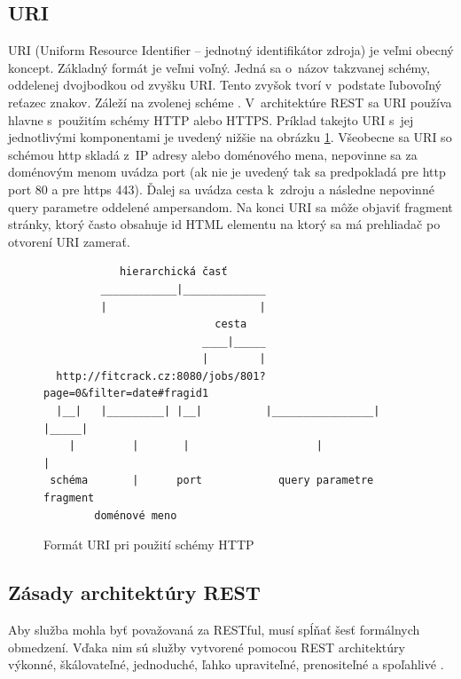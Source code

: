 \documentclass[zadani,slovak]{fitthesis}
\begin{document}
\subsection{URI} \label{URI}
URI (Uniform Resource Identifier – jednotný identifikátor zdroja) je veľmi obecný koncept. Základný formát je veľmi voľný. Jedná sa o~názov takzvanej schémy, oddelenej dvojbodkou od zvyšku URI. Tento zvyšok tvorí v~podstate ľubovoľný reťazec znakov. Záleží na zvolenej schéme \cite{URIRFC}. V~architektúre REST sa URI používa hlavne s~použitím schémy HTTP alebo HTTPS. Príklad takejto URI s~jej jednotlivými komponentami je uvedený nižšie na obrázku \ref{fig:formatURI}. Všeobecne sa URI so schémou http skladá z~IP adresy alebo doménového mena, nepovinne sa za doménovým menom uvádza port (ak nie je uvedený tak sa predpokladá pre http port 80 a pre https 443). Ďalej sa uvádza cesta k~zdroju a následne nepovinné query parametre oddelené ampersandom. Na konci URI sa môže objaviť fragment stránky, ktorý často obsahuje id HTML elementu na ktorý sa má prehliadač po otvorení URI zamerať.



\begin{figure}[H]
\begin{center}
\begin{varwidth}{\linewidth}
\begin{verbatim}
            hierarchická časť
         ____________|_____________                  
         |                        |
                           cesta
                         ____|_____
                         |        |
  http://fitcrack.cz:8080/jobs/801?page=0&filter=date#fragid1
  |__|   |_________| |__|          |________________| |_____|
    |         |       |                    |               |
 schéma       |      port            query parametre    fragment
        doménové meno

\end{verbatim}
\end{varwidth}
\end{center}
\caption{Formát URI pri použití schémy HTTP}
\label{fig:formatURI}
\end{figure}



\subsection{Zásady architektúry REST} \label{zasadyREST}
Aby služba mohla byť považovaná za RESTful, musí spĺňať šesť formálnych obmedzení. Vďaka nim sú služby vytvorené pomocou REST architektúry výkonné, škálovateľné, jednoduché, ľahko upraviteľné, prenositeľné a spoľahlivé \cite{masse2011rest}.
\end{document}
